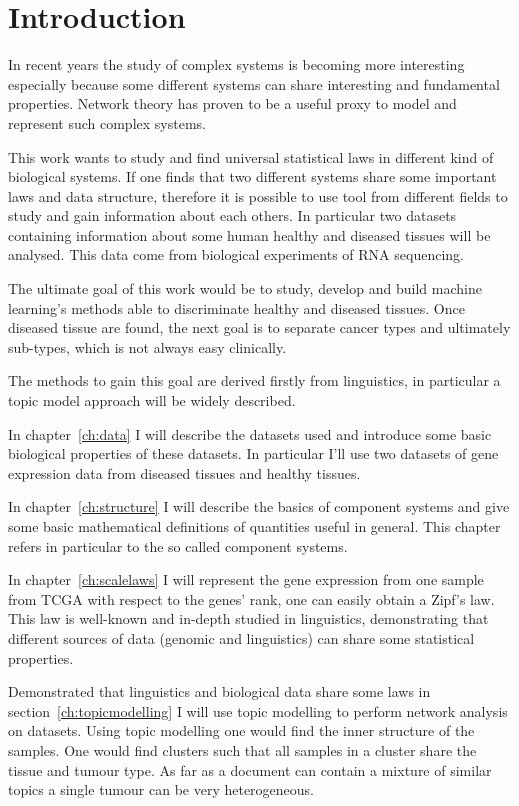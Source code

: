 \chapter{Introduction}\label{ch:intro}
In recent years the study of complex systems is becoming more interesting 
especially because some different systems can share interesting and fundamental 
properties. Network theory has proven to be a useful proxy to model and represent such complex 
systems.

This work wants to study and find universal statistical laws in different kind of biological systems.
If one finds that two different systems share some important laws and data structure, therefore it is possible to use tool from different fields 
to study and gain information about each others. 
In particular two datasets containing information about some human healthy and 
diseased tissues will be analysed. This data come from biological experiments of 
RNA sequencing.

The ultimate goal of this work would be to study, develop and build machine learning's methods able to 
discriminate healthy and diseased tissues. Once diseased tissue are found, the 
next goal is to separate cancer types and ultimately sub-types, which is not 
always easy clinically.

The methods to gain this goal are derived firstly from linguistics, in 
particular a topic model approach will be widely described.

In chapter~\ref{ch:data} I will describe the datasets used and introduce some 
basic biological properties of these datasets. In particular I'll use two datasets of gene expression data from 
diseased tissues and healthy tissues.

In chapter~\ref{ch:structure} I will describe the basics of component systems 
and give some basic mathematical definitions of quantities useful in general. 
This chapter refers in particular to the so called component systems.

In chapter~\ref{ch:scalelaws} I will represent the gene expression from one sample from TCGA 
with respect to the genes' rank, one can easily obtain a Zipf's law. This law is 
well-known and in-depth studied in linguistics, demonstrating that different sources of data (genomic and linguistics) 
can share some statistical properties.

Demonstrated that linguistics and biological data share some laws in section~\ref{ch:topicmodelling} 
I will use topic modelling to perform network analysis on datasets.
Using topic modelling one would find the inner structure of the samples.
One would find clusters such that all samples in a cluster share the tissue and tumour type.
As far as a document can contain a mixture of similar topics a single tumour can be very heterogeneous.


